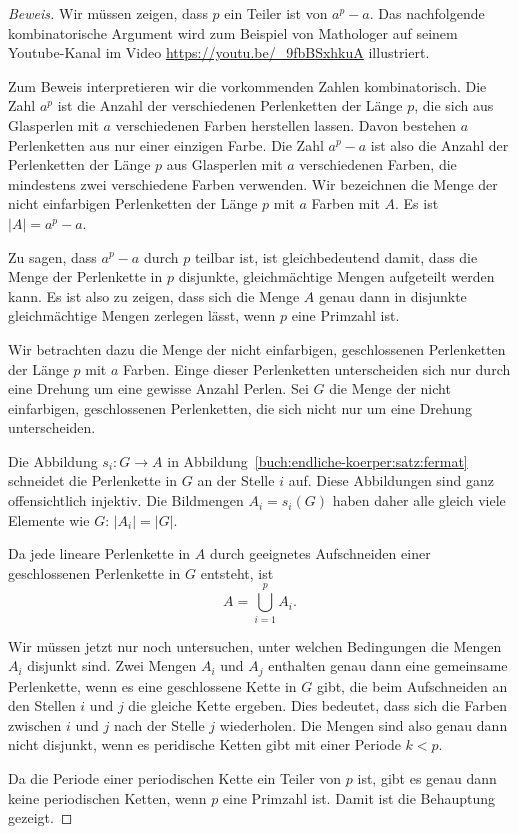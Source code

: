 \begin{proof}[Beweis]
Wir müssen zeigen, dass $p$ ein Teiler ist von $a^p-a$.
Das nachfolgende kombinatorische Argument wird zum Beispiel
von Mathologer auf seinem Youtube-Kanal im Video
\url{https://youtu.be/_9fbBSxhkuA} illustriert.

Zum Beweis interpretieren wir die vorkommenden Zahlen kombinatorisch.
Die Zahl $a^p$ ist die Anzahl der verschiedenen Perlenketten der Länge
$p$, die sich aus Glasperlen mit $a$ verschiedenen Farben herstellen
lassen.
Davon bestehen $a$ Perlenketten aus nur einer einzigen Farbe.
Die Zahl $a^p-a$ ist also die Anzahl der Perlenketten der Länge $p$
aus Glasperlen mit $a$ verschiedenen Farben, die mindestens zwei
verschiedene Farben verwenden.
Wir bezeichnen die Menge der nicht einfarbigen Perlenketten der
Länge $p$ mit $a$ Farben mit $A$.
Es ist $|A|=a^p-a$.

Zu sagen, dass $a^p-a$ durch $p$ teilbar ist, ist gleichbedeutend
damit, dass die Menge der Perlenkette in $p$
disjunkte, gleichmächtige Mengen aufgeteilt werden kann.
Es ist also zu zeigen, dass sich die Menge $A$ genau dann in
disjunkte gleichmächtige Mengen zerlegen lässt, wenn $p$ eine
Primzahl ist.

Wir betrachten dazu die Menge der nicht einfarbigen, geschlossenen
Perlenketten der Länge $p$ mit $a$ Farben.
Einge dieser Perlenketten unterscheiden sich nur durch eine
Drehung um eine gewisse Anzahl Perlen.
Sei $G$ die Menge der nicht einfarbigen, geschlossenen
Perlenketten, die sich nicht nur um eine Drehung unterscheiden.

Die Abbildung $s_i\colon G\to A$
in Abbildung~\ref{buch:endliche-koerper:satz:fermat} 
schneidet die Perlenkette in $G$ an der Stelle $i$ auf.
Diese Abbildungen sind ganz offensichtlich injektiv.
Die Bildmengen $A_i = s_i(G)$ haben daher alle gleich
viele Elemente wie $G$: $|A_i|=|G|$.

Da jede lineare Perlenkette in $A$ durch geeignetes Aufschneiden
einer geschlossenen Perlenkette in $G$ entsteht, ist 
\[
A=\bigcup_{i=1}^p A_i.
\]

Wir müssen jetzt nur noch untersuchen, unter welchen Bedingungen
die Mengen $A_i$ disjunkt sind.
Zwei Mengen $A_i$ und $A_j$ enthalten genau dann eine
gemeinsame Perlenkette, wenn es eine geschlossene Kette in $G$
gibt, die beim Aufschneiden an den Stellen $i$ und $j$ die
gleiche Kette ergeben.
Dies bedeutet, dass sich die Farben zwischen $i$ und $j$ nach
der Stelle $j$ wiederholen.
Die Mengen sind also genau dann nicht disjunkt, wenn es
peridische Ketten gibt mit einer Periode $k<p$.

Da die Periode einer periodischen Kette ein Teiler von $p$
ist, gibt es genau dann keine periodischen Ketten, wenn $p$
eine Primzahl ist.
Damit ist die Behauptung gezeigt.
\end{proof}

